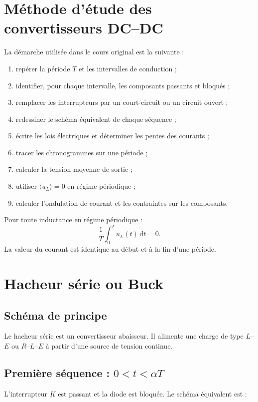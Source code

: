 \section{Méthode d'étude des convertisseurs DC--DC}
La démarche utilisée dans le cours original est la suivante :
\begin{enumerate}
\item repérer la période $T$ et les intervalles de conduction ;
\item identifier, pour chaque intervalle, les composants passants et bloqués ;
\item remplacer les interrupteurs par un court-circuit ou un circuit ouvert ;
\item redessiner le schéma équivalent de chaque séquence ;
\item écrire les lois électriques et déterminer les pentes des courants ;
\item tracer les chronogrammes sur une période ;
\item calculer la tension moyenne de sortie ;
\item utiliser $\langle u_L\rangle=0$ en régime périodique ;
\item calculer l'ondulation de courant et les contraintes sur les composants.
\end{enumerate}

\begin{retenir}
Pour toute inductance en régime périodique :
\[
\frac1T\int_0^T u_L(t)\,\mathrm dt=0.
\]
La valeur du courant est identique au début et à la fin d'une période.
\end{retenir}

\section{Hacheur série ou Buck}

\subsection{Schéma de principe}
Le hacheur série est un convertisseur abaisseur. Il alimente une charge de type $L$--$E$ ou $R$--$L$--$E$ à partir d'une source de tension continue.

\begin{center}\TLHacheurBuck\end{center}

\subsection{Première séquence : $0<t<\alpha T$}
L'interrupteur $K$ est passant et la diode est bloquée. Le schéma équivalent est :

